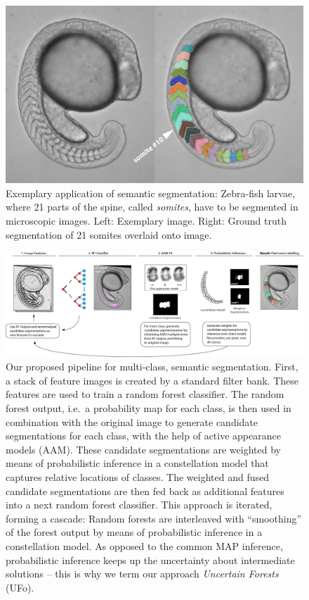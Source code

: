 \documentclass[10pt,twocolumn,letterpaper]{article}
\begin{document}
\begin{figure}[t]
\begin{center}
\includegraphics[width=\columnwidth]{TopRight.jpg} %
\caption{Exemplary application of semantic segmentation: Zebra-fish larvae, where 21 parts of the spine, called \emph{somites}, have to be segmented in microscopic images. Left: Exemplary image. Right: Ground truth segmentation of 21 somites overlaid onto image. }
\label{fig:teaser}
\end{center}
\end{figure}

\begin{figure}[t]
\begin{center}
\includegraphics[width=\textwidth]{pipelineBIG2.jpg} %
\caption{Our proposed pipeline for multi-class, semantic segmentation. First, a stack of feature images is created by a standard filter bank. These features are used to train a random forest classifier. The random forest output, i.e.\ a probability map for each class, is then used in combination with the original image to generate candidate segmentations for each class, with the help of active appearance models (AAM). These candidate segmentations are weighted by means of probabilistic inference in a constellation model that captures relative locations of classes. The weighted and fused candidate segmentations are then fed back as additional features into a next random forest classifier. This approach is iterated, forming a cascade: Random forests are interleaved with ``smoothing'' of the forest output by means of probabilistic inference in a constellation model. As opposed to the common MAP inference, probabilistic inference keeps up the uncertainty about intermediate solutions -- this is why we term our approach \emph{Uncertain Forests} (UFo).}
\label{fig:pipeline}
\end{center}
\end{figure}
\end{document}
